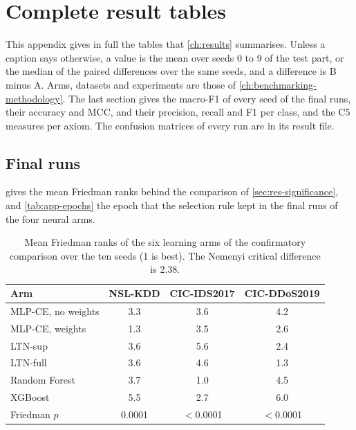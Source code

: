 \chapter{Complete result tables}
\label{app:results}

This appendix gives in full the tables that \cref{ch:results} summarises. Unless a caption says otherwise, a value is
the mean over seeds 0 to 9 of the test part, or the median of the paired differences over the same seeds, and a
difference is B minus A. Arms, datasets and experiments are those of \cref{ch:benchmarking-methodology}.
The last section gives the macro-F1 of every seed of the final runs, their accuracy and MCC, and
their precision, recall and F1 per class, and the C5 measures per axiom. The confusion matrices of every run are in its result file.

\section{Final runs}

 gives the mean Friedman ranks behind the comparison of \cref{sec:res-significance},
and \cref{tab:app-epochs} the epoch that the selection rule kept in the final runs of the four neural arms.


\begin{table}[htbp]
\centering
\footnotesize
\caption{Mean Friedman ranks of the six learning arms of the confirmatory comparison over the ten seeds (1 is best).
The Nemenyi critical difference is 2.38.}
\label{tab:app-ranks}
\setlength{\tabcolsep}{4pt}
\begin{tabular}{@{}lccc@{}}
\toprule
Arm & NSL-KDD & CIC-IDS2017 & CIC-DDoS2019 \\
\midrule
MLP-CE, no weights & 3.3 & 3.6 & 4.2 \\
MLP-CE, weights    & 1.3 & 3.5 & 2.6 \\
LTN-sup            & 3.6 & 5.6 & 2.4 \\
LTN-full           & 3.6 & 4.6 & 1.3 \\
Random Forest      & 3.7 & 1.0 & 4.5 \\
XGBoost            & 5.5 & 2.7 & 6.0 \\
\midrule
Friedman $p$       & 0.0001 & $<$0.0001 & $<$0.0001 \\
\bottomrule
\end{tabular}
\end{table}

